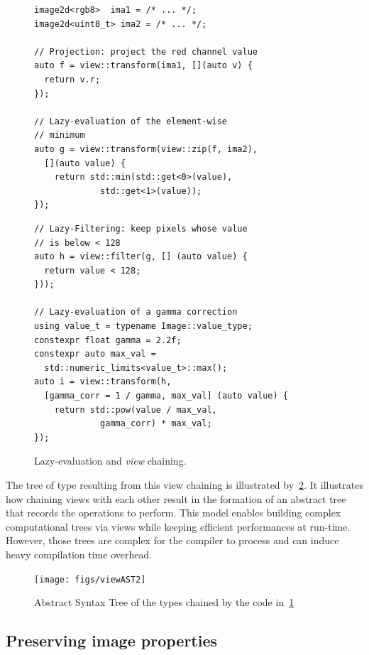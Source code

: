 \begin{figure}[htbp]
  \begin{minipage}[l]{0.48\linewidth}
    \begin{verbatim}
image2d<rgb8>  ima1 = /* ... */;
image2d<uint8_t> ima2 = /* ... */;

// Projection: project the red channel value
auto f = view::transform(ima1, [](auto v) {
  return v.r;
});

// Lazy-evaluation of the element-wise
// minimum
auto g = view::transform(view::zip(f, ima2),
  [](auto value) {
    return std::min(std::get<0>(value),
             std::get<1>(value));
});
\end{verbatim}
  \end{minipage}
  \hfill
  \begin{minipage}[l]{0.48\linewidth}
    \begin{verbatim}
// Lazy-Filtering: keep pixels whose value
// is below < 128
auto h = view::filter(g, [] (auto value) {
  return value < 128;
}));

// Lazy-evaluation of a gamma correction
using value_t = typename Image::value_type;
constexpr float gamma = 2.2f;
constexpr auto max_val =
  std::numeric_limits<value_t>::max();
auto i = view::transform(h,
  [gamma_corr = 1 / gamma, max_val] (auto value) {
    return std::pow(value / max_val,
             gamma_corr) * max_val;
});
\end{verbatim}
  \end{minipage}

  \caption{Lazy-evaluation and \emph{view} chaining.}
  \label{fig.lazy}
\end{figure}

The tree of type resulting from this view chaining is illustrated by~\cref{fig.viewAST}. It illustrates how chaining
views with each other result in the formation of an abstract tree that records the operations to perform. This model
enables building complex computational trees via views while keeping efficient performances at run-time. However, those
trees are complex for the compiler to process and can induce heavy compilation time overhead.

\begin{figure}[htb]
  \centering
  \texttt{[image: figs/viewAST2]}
  \caption{Abstract Syntax Tree of the types chained by the code in~\cref{fig.lazy}}
  \label{fig.viewAST}
\end{figure}


\subsection{Preserving image properties}

